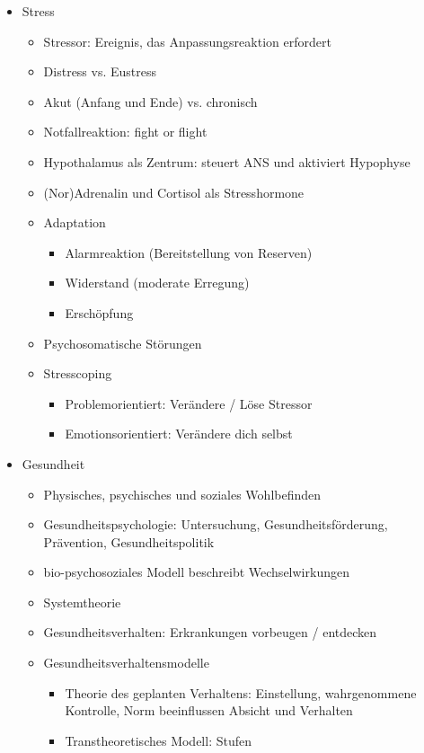 \documentclass[11pt, paper=a4, twocolumn]{scrartcl}
\begin{document}
\begin{itemize}
		\item Stress
			\begin{itemize}
				\item Stressor: Ereignis, das Anpassungsreaktion erfordert 
				\item Distress vs. Eustress
				\item Akut (Anfang und Ende) vs. chronisch
				\item Notfallreaktion: fight or flight
				\item Hypothalamus als Zentrum: steuert ANS und aktiviert 
					Hypophyse
				\item (Nor)Adrenalin und Cortisol als Stresshormone
				\item Adaptation
					\begin{itemize}
						\item Alarmreaktion (Bereitstellung von 
							Reserven)
						\item Widerstand (moderate Erregung)
						\item Erschöpfung
					\end{itemize}
				\item Psychosomatische Störungen
				\item Stresscoping
					\begin{itemize}
						\item Problemorientiert: Verändere / Löse 
							Stressor
						\item Emotionsorientiert: Verändere dich 
							selbst
					\end{itemize}
			\end{itemize}

		\item Gesundheit
			\begin{itemize}
				\item Physisches, psychisches und soziales Wohlbefinden
				\item Gesundheitspsychologie: Untersuchung, 
					Gesundheitsförderung, Prävention, 
					Gesundheitspolitik
				\item bio-psychosoziales Modell beschreibt Wechselwirkungen
				\item Systemtheorie
				\item Gesundheitsverhalten: Erkrankungen vorbeugen / 
					entdecken
				\item Gesundheitsverhaltensmodelle
					\begin{itemize}
						\item Theorie des geplanten Verhaltens: 
							Einstellung, wahrgenommene 
							Kontrolle, Norm beeinflussen 
							Absicht und Verhalten
						\item Transtheoretisches Modell: Stufen
					\end{itemize}
			\end{itemize}
	\end{itemize}
\end{document}
